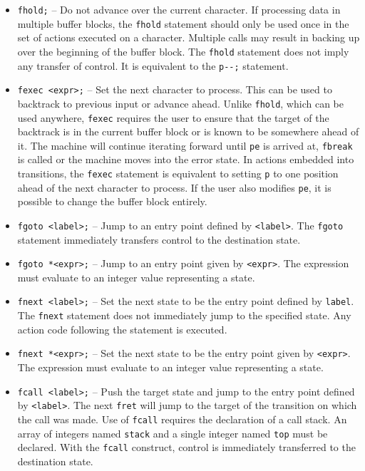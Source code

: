 \documentclass[letterpaper,11pt,oneside]{book}
\begin{document}
\begin{itemize}

\item \verb|fhold;| -- Do not advance over the current character. If processing
data in multiple buffer blocks, the \verb|fhold| statement should only be used
once in the set of actions executed on a character.  Multiple calls may result
in backing up over the beginning of the buffer block. The \verb|fhold|
statement does not imply any transfer of control. It is equivalent to the
\verb|p--;| statement. 

\item \verb|fexec <expr>;| -- Set the next character to process. This can be
used to backtrack to previous input or advance ahead.
Unlike \verb|fhold|, which can be used
anywhere, \verb|fexec| requires the user to ensure that the target of the
backtrack is in the current buffer block or is known to be somewhere ahead of
it. The machine will continue iterating forward until \verb|pe| is arrived at,
\verb|fbreak| is called or the machine moves into the error state. In actions
embedded into transitions, the \verb|fexec| statement is equivalent to setting
\verb|p| to one position ahead of the next character to process.  If the user
also modifies \verb|pe|, it is possible to change the buffer block entirely.

\item \verb|fgoto <label>;| -- Jump to an entry point defined by
\verb|<label>|.  The \verb|fgoto| statement immediately transfers control to
the destination state.

\item \verb|fgoto *<expr>;| -- Jump to an entry point given by \verb|<expr>|.
The expression must evaluate to an integer value representing a state.

\item \verb|fnext <label>;| -- Set the next state to be the entry point defined
by \verb|label|.  The \verb|fnext| statement does not immediately jump to the
specified state. Any action code following the statement is executed.

\item \verb|fnext *<expr>;| -- Set the next state to be the entry point given
by \verb|<expr>|. The expression must evaluate to an integer value representing
a state.

\item \verb|fcall <label>;| -- Push the target state and jump to the entry
point defined by \verb|<label>|.  The next \verb|fret| will jump to the target
of the transition on which the call was made. Use of \verb|fcall| requires
the declaration of a call stack. An array of integers named \verb|stack| and a
single integer named \verb|top| must be declared. With the \verb|fcall|
construct, control is immediately transferred to the destination state.


\end{itemize}
\end{document}
